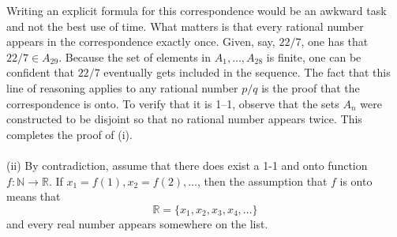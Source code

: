 \documentclass{article}
\begin{document}
            Writing an explicit formula for this correspondence would be an awkward task and not the best use of time. What matters is that every rational number appears in the correspondence exactly once. Given, say, $22/7$, one has that $22/7 \in A_{29}$. Because the set of elements in $A_1,\dots,A_{28}$ is finite, one can be confident that $22/7$ eventually gets included in the sequence. The fact that this line of reasoning applies to any rational number $p/q$ is the proof that the correspondence is onto. To verify that it is 1–1, observe that the sets $A_n$ were constructed to be disjoint so that no rational number appears twice. This completes the proof of (i).
            \\ \\
            (ii) By contradiction, assume that there does exist a 1-1 and onto function $f:\mathbb{N} \to \mathbb{R}$. If $x_1 = f(1), x_2 = f(2), \dots$, then the assumption that $f$ is onto means that
            \begin{equation}
                \mathbb{R} = \{x_1,x_2,x_3,x_4,\dots\}
                \label{theorem1.5.6}
            \end{equation}
            and every real number appears somewhere on the list.
            
\end{document}
